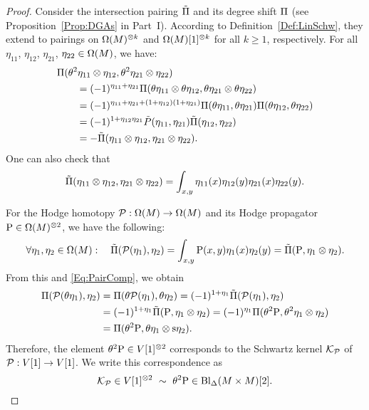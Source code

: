 \documentclass[\MainFolder/Text.tex]{subfiles}
\begin{document}
\begin{proof}
Consider the intersection pairing $\tilde{\Pi}$ and its degree shift $\Pi$ (see Proposition~\ref{Prop:DGAs} in Part~I). According to Definition~\ref{Def:LinSchw}, they extend to pairings on $\Omega(M)^{\otimes k}$ and $\Omega(M)[1]^{\otimes k}$ for all $k\ge 1$, respectively. For all $\eta_{11}$, $\eta_{12}$, $\eta_{21}$, $\eta_{22}\in \Omega(M)$, we have:
\begin{equation}\label{Eq:PairComp}
\begin{aligned}
&\Pi(\theta^2 \eta_{11}\otimes \eta_{12},\theta^2 \eta_{21}\otimes \eta_{22}) \\ 
&\qquad = (-1)^{\eta_{11} + \eta_{21}} \Pi(\theta\eta_{11}\otimes \theta\eta_{12}, \theta \eta_{21}\otimes \theta\eta_{22}) \\
&\qquad = (-1)^{\eta_{11} + \eta_{21} + (1+\eta_{12})(1+\eta_{21})} \Pi(\theta \eta_{11}, \theta \eta_{21}) \Pi(\theta \eta_{12},\theta \eta_{22})\\
&\qquad =(-1)^{1+\eta_{12}\eta_{21}} \tilde{P}(\eta_{11},\eta_{21})\tilde{\Pi}(\eta_{12},\eta_{22}) \\
&\qquad = - \tilde{\Pi}(\eta_{11}\otimes \eta_{12}, \eta_{21}\otimes \eta_{22}).
\end{aligned}
\end{equation}
One can also check that
$$ \tilde{\Pi}(\eta_{11} \otimes \eta_{12}, \eta_{21}\otimes\eta_{22}) = \int_{x,y} \eta_{11}(x)\eta_{12}(y)\eta_{21}(x)\eta_{22}(y). $$

For the Hodge homotopy $\mathcal{P}: \Omega(M) \rightarrow \Omega(M)$ and its Hodge propagator $\mathrm{P} \in \Omega(M)^{\otimes 2}$, we have the following:
$$ \forall \eta_1, \eta_2\in \Omega(M): \quad \tilde{\Pi}(\mathcal{P}(\eta_1),\eta_2) = \int_{x,y} \mathrm{P}(x,y)\eta_1(x)\eta_2(y) = \tilde{\Pi}(\mathrm{P}, \eta_1\otimes \eta_2). $$
From this and \eqref{Eq:PairComp}, we obtain
$$\begin{aligned}
\Pi(\mathcal{P}(\theta \eta_1),\eta_2) &= \Pi(\theta \mathcal{P}(\eta_1),\theta \eta_2) = (-1)^{1+\eta_1} \tilde{\Pi}(\mathcal{P}(\eta_1),\eta_2) \\ &= (-1)^{1+\eta_1} \tilde{\Pi}(\mathrm{P},\eta_1\otimes \eta_2) = (-1)^{\eta_1}\Pi(\theta^2 \mathrm{P}, \theta^2 \eta_1 \otimes \eta_2)  \\ &= \Pi(\theta^2 \mathrm{P}, \theta\eta_1 \otimes \mathrm{s}\eta_2).
\end{aligned}$$
Therefore, the element $\theta^{2} \mathrm{P} \in V[1]^{\otimes 2}$ corresponds to the Schwartz kernel $\mathcal{K}_{\mathcal{P}}$ of $\mathcal{P}: V[1] \rightarrow V[1]$. We write this correspondence as
$$ \mathcal{K}_{\mathcal{P}}\in V[1]^{\otimes 2}\ \sim\ \theta^2 \mathrm{P} \in \mathrm{Bl}_\Delta(M\times M)[2]. $$


\end{proof}
\end{document}
